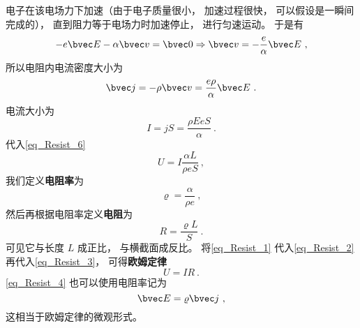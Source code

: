 电子在该电场力下加速（由于电子质量很小， 加速过程很快， 可以假设是一瞬间完成的）， 直到阻力等于电场力时加速停止， 进行匀速运动。 于是有
\begin{equation}
-e\bvec E - \alpha \bvec v = \bvec 0 \Rightarrow \bvec v = -\frac{e}{\alpha}\bvec E~,
\end{equation}
所以电阻内电流密度大小为
\begin{equation}\label{eq_Resist_4}
\bvec j = -\rho \bvec v = \frac{e\rho}{\alpha}\bvec E~.
\end{equation}
电流大小为
\begin{equation}
I = jS = \frac{\rho EeS}{\alpha}~.
\end{equation}
代入\autoref{eq_Resist_6} 
\begin{equation}\label{eq_Resist_3}
U = I \frac{\alpha L}{\rho eS}~,
\end{equation}
我们定义\textbf{电阻率}为
\begin{equation}\label{eq_Resist_1}
\varrho = \frac{\alpha}{\rho e}~,
\end{equation}
然后再根据电阻率定义\textbf{电阻}为
\begin{equation}\label{eq_Resist_2}
R = \frac{\varrho L}{S}~.
\end{equation}
可见它与长度 $L$ 成正比， 与横截面成反比。 将\autoref{eq_Resist_1} 代入\autoref{eq_Resist_2} 再代入\autoref{eq_Resist_3}， 可得\textbf{欧姆定律}
\begin{equation}
U = IR~.
\end{equation}
\autoref{eq_Resist_4} 也可以使用电阻率记为
\begin{equation}
\bvec E = \varrho\bvec j~,
\end{equation}
这相当于欧姆定律的微观形式。
